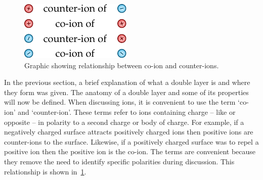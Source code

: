     \begin{figure}
      \begin{center}
        \includegraphics{content/introduction/graphics/counterAndCoIons}
      \end{center}
      \caption{Graphic showing relationship between co-ion and counter-ions.}
      \label{fig:counterAndCoIons}
    \end{figure}
    In the previous section, a brief explanation of what a double layer is and where they form was given.
    The anatomy of a double layer and some of its properties will now be defined.
    When discussing ions, it is convenient to use the  term `co-ion' and `counter-ion'.
    These terms refer to ions containing charge -- like or opposite -- in polarity to a second charge or body of charge.
    For example, if a negatively charged surface attracts positively charged ions then positive ions are counter-ions to the surface.
    Likewise, if a positively charged surface was to repel a positive ion then the positive ion is the co-ion.
    The terms are convenient because they remove the need to identify specific polarities during discussion.
    This relationship is shown in~\cref{fig:counterAndCoIons}.


